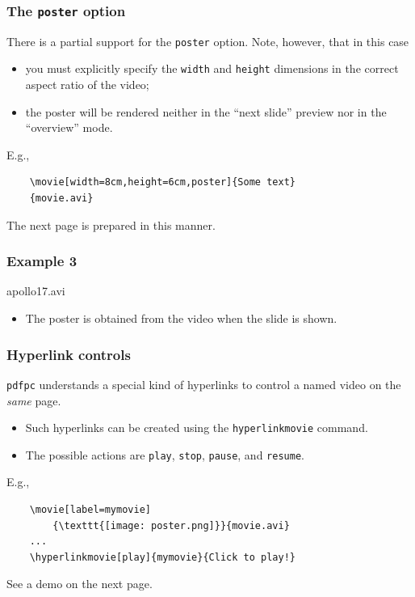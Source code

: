 \documentclass{beamer}
\newcommand{\singleitem}[1]{\begin{itemize}\item #1\end{itemize}}
\newcommand{\pdfpc}{\texttt{pdfpc}\xspace}
\newcommand{\opt}[1]{\texttt{#1}\xspace}
\begin{document}
\begin{frame}[fragile]
  \frametitle{The \opt{poster} option}
  \hypertarget{posterPage}{}
  There is a partial support for the \opt{poster} option. Note, however, that in
  this case
  \begin{itemize}
    \item you must explicitly specify the \opt{width} and \opt{height}
          dimensions in the correct aspect ratio of the video;
    \item the poster will be rendered neither in the ``next slide''
          preview nor in the ``overview'' mode.
  \end{itemize}

  \vspace{10pt}

  E.g.,
  \begin{lstlisting}
    \movie[width=8cm,height=6cm,poster]{Some text}
    {movie.avi}
  \end{lstlisting}

  \vfill
  The next page is prepared in this manner.

\end{frame}

\begin{frame}
  \frametitle{Example 3}

  \vspace{10pt}
  \begin{center}
        {apollo17.avi}
  \end{center}

  \vfill
  \singleitem{The poster is obtained from the video when the slide is shown.}
\end{frame}

\begin{frame}[fragile]
  \frametitle{Hyperlink controls}

  \pdfpc understands a special kind of hyperlinks to control a named video on
  the {\em same} page.

  \begin{itemize}
    \item Such hyperlinks can be created using the \opt{hyperlinkmovie}
          command.
    \item The possible actions are \opt{play}, \opt{stop}, \opt{pause}, and
          \opt{resume}.
  \end{itemize}

  \vspace{10pt}

  E.g.,
  \begin{lstlisting}
    \movie[label=mymovie]
        {\texttt{[image: poster.png]}}{movie.avi}
    ...
    \hyperlinkmovie[play]{mymovie}{Click to play!}
  \end{lstlisting}

  \vfill
  See a demo on the next page.
\end{frame}
\end{document}
